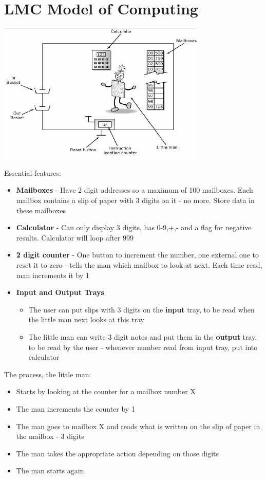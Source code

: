 \documentclass{article}[18pt]
\begin{document}
\section{LMC Model of Computing}
\begin{center}
\includegraphics[width=10cm]{LMC.png}
\end{center}
Essential features:
\begin{itemize}
\item \textbf{Mailboxes} - Have 2 digit addresses so a maximum of 100 mailboxes. Each mailbox contains a slip of paper with 3 digits on it - no more. Store data in these mailboxes
\item \textbf{Calculator} - Can only display 3 digits, has 0-9,+,- and a flag for negative results. Calculator will loop after 999
\item \textbf{2 digit counter} - One button to increment the number, one external one to reset it to zero - tells the man which mailbox to look at next. Each time read, man increments it by 1
\item \textbf{Input and Output Trays}\begin{itemize}
\item The user can put slips with 3 digits on the \textbf{input} tray, to be read when the little man next looks at this tray
\item The little man can write 3 digit notes and put them in the \textbf{output} tray, to be read by the user  - whenever number read from input tray, put into calculator
\end{itemize}
\end{itemize}
The process, the little man:
\begin{itemize}
\item Starts by looking at the counter for a mailbox number X
\item The man increments the counter by 1
\item The man goes to mailbox X and reads what is written on the slip of paper in the mailbox - 3 digits
\item The man takes the appropriate action depending on those digits
\item The man starts again
\end{itemize}
\end{document}
